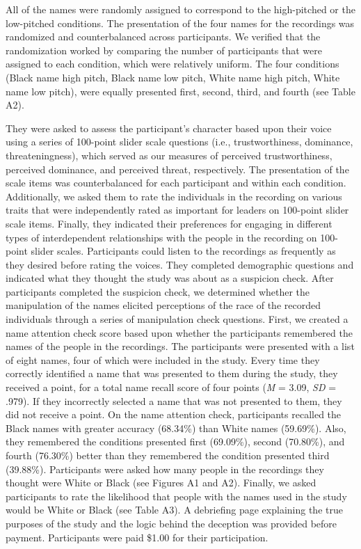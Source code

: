 \documentclass[
  english,
  man]{apa6}
\begin{document}
All of the names were randomly assigned to correspond to the high-pitched or the low-pitched conditions. The presentation of the four names for the recordings was randomized and counterbalanced across participants. We verified that the randomization worked by comparing the number of participants that were assigned to each condition, which were relatively uniform. The four conditions (Black name high pitch, Black name low pitch, White name high pitch, White name low pitch), were equally presented first, second, third, and fourth (see Table A2).

They were asked to assess the participant's character based upon their voice using a series of 100-point slider scale questions (i.e., trustworthiness, dominance, threateningness), which served as our measures of perceived trustworthiness, perceived dominance, and perceived threat, respectively. The presentation of the scale items was counterbalanced for each participant and within each condition. Additionally, we asked them to rate the individuals in the recording on various traits that were independently rated as important for leaders on 100-point slider scale items. Finally, they indicated their preferences for engaging in different types of interdependent relationships with the people in the recording on 100-point slider scales. Participants could listen to the recordings as frequently as they desired before rating the voices. They completed demographic questions and indicated what they thought the study was about as a suspicion check. After participants completed the suspicion check, we determined whether the manipulation of the names elicited perceptions of the race of the recorded individuals through a series of manipulation check questions. First, we created a name attention check score based upon whether the participants remembered the names of the people in the recordings. The participants were presented with a list of eight names, four of which were included in the study. Every time they correctly identified a name that was presented to them during the study, they received a point, for a total name recall score of four points (\emph{M} = 3.09, \emph{SD} = .979). If they incorrectly selected a name that was not presented to them, they did not receive a point. On the name attention check, participants recalled the Black names with greater accuracy (68.34\%) than White names (59.69\%). Also, they remembered the conditions presented first (69.09\%), second (70.80\%), and fourth (76.30\%) better than they remembered the condition presented third (39.88\%). Participants were asked how many people in the recordings they thought were White or Black (see Figures A1 and A2). Finally, we asked participants to rate the likelihood that people with the names used in the study would be White or Black (see Table A3). A debriefing page explaining the true purposes of the study and the logic behind the deception was provided before payment. Participants were paid \$1.00 for their participation.
\end{document}
